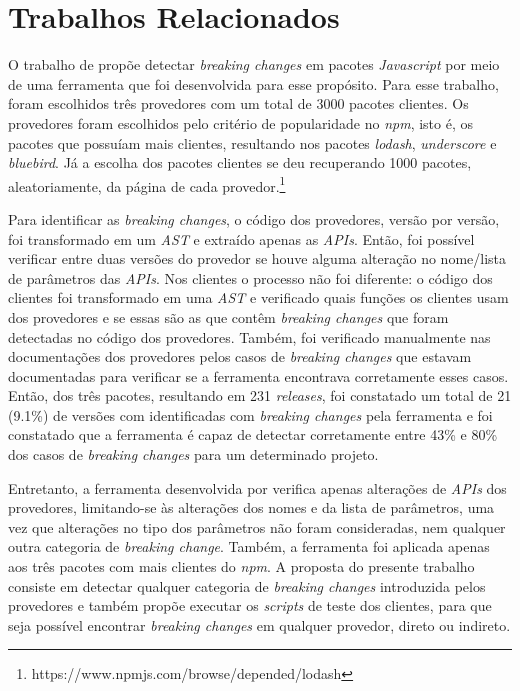\section{Trabalhos Relacionados}
\label{sec:related_works}

O trabalho de  propõe detectar \textit{breaking changes} em pacotes \textit{Javascript} por meio de uma ferramenta que foi desenvolvida para esse propósito. Para esse trabalho, foram escolhidos três provedores com um total de 3000 pacotes clientes. Os provedores foram escolhidos pelo critério de popularidade no \textit{npm}, isto é, os pacotes que possuíam mais clientes, resultando nos pacotes \textit{lodash}, \textit{underscore} e \textit{bluebird}. Já a escolha dos pacotes clientes se deu recuperando 1000 pacotes, aleatoriamente, da página de cada provedor.\footnote{https://www.npmjs.com/browse/depended/lodash}

Para identificar as \textit{breaking changes}, o código dos provedores, versão por versão, foi transformado em um \textit{AST} e extraído apenas as \textit{APIs}. Então, foi possível verificar entre duas versões do provedor se houve alguma alteração no nome/lista de parâmetros das \textit{APIs}. Nos clientes o processo não foi diferente: o código dos clientes foi transformado em uma \textit{AST} e verificado quais funções os clientes usam dos provedores e se essas são as que contêm \textit{breaking changes} que foram detectadas no código dos provedores. Também, foi verificado manualmente nas documentações dos provedores pelos casos de \textit{breaking changes} que estavam documentadas para verificar se a ferramenta encontrava corretamente esses casos. Então, dos três pacotes, resultando em 231 \textit{releases}, foi constatado um total de 21 (9.1\%) de versões com identificadas com \textit{breaking changes} pela ferramenta e foi constatado que a ferramenta é capaz de detectar corretamente entre 43\% e 80\% dos casos de \textit{breaking changes} para um determinado projeto.

Entretanto, a ferramenta desenvolvida por  verifica apenas alterações de \textit{APIs} dos provedores, limitando-se às alterações dos nomes e da lista de parâmetros, uma vez que alterações no tipo dos parâmetros não foram consideradas, nem qualquer outra categoria de \textit{breaking change}. Também, a ferramenta foi aplicada apenas aos três pacotes com mais clientes do \textit{npm}. A proposta do presente trabalho consiste em detectar qualquer categoria de \textit{breaking changes} introduzida pelos provedores e também propõe executar os \textit{scripts} de teste dos clientes, para que seja possível encontrar \textit{breaking changes} em qualquer provedor, direto ou indireto.

